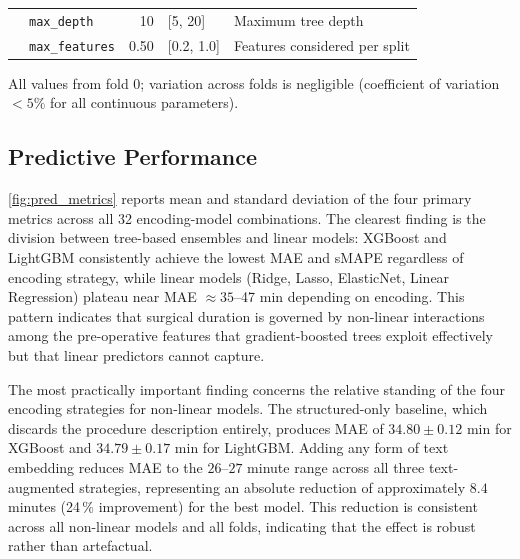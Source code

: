 \begin{table}[tp]
\begin{threeparttable}
{\begin{tabular}{llrll}
              & \texttt{max\_depth}     & 10  & [5, 20]          & Maximum tree depth \\
              & \texttt{max\_features}  & 0.50 & [0.2, 1.0]      & Features considered per split \\
\bottomrule
\end{tabular}}
\begin{tablenotes}
\small
\item All values from fold 0; variation across folds is negligible (coefficient of variation $< 5\%$ for all continuous parameters).
\end{tablenotes}
\end{threeparttable}
\end{table}

\subsection{Predictive Performance}
\label{sec:perf}

\cref{fig:pred_metrics} reports mean and standard deviation of the four primary metrics across all 32 encoding-model combinations. The clearest finding is the division between tree-based ensembles and linear models: XGBoost and LightGBM consistently achieve the lowest MAE and sMAPE regardless of encoding strategy, while linear models (Ridge, Lasso, ElasticNet, Linear Regression) plateau near MAE $\approx 35$--47 min depending on encoding. This pattern indicates that surgical duration is governed by non-linear interactions among the pre-operative features that gradient-boosted trees exploit effectively but that linear predictors cannot capture.

The most practically important finding concerns the relative standing of the four encoding strategies for non-linear models. The structured-only baseline, which discards the procedure description entirely, produces MAE of $34.80 \pm 0.12$ min for XGBoost and $34.79 \pm 0.17$ min for LightGBM. Adding any form of text embedding reduces MAE to the $26$--$27$ minute range across all three text-augmented strategies, representing an absolute reduction of approximately $8.4$ minutes (24\,\% improvement) for the best model. This reduction is consistent across all non-linear models and all folds, indicating that the effect is robust rather than artefactual.


